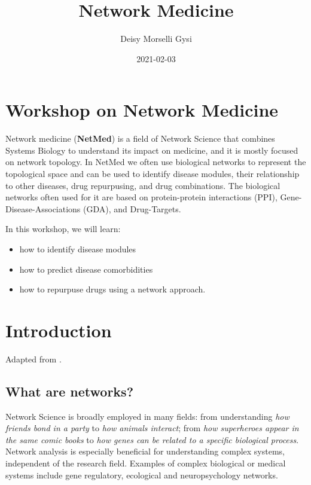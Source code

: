 \documentclass[
]{book}
\title{Network Medicine}
\author{Deisy Morselli Gysi}
\date{2021-02-03}
\providecommand{\tightlist}{%
  \setlength{\itemsep}{0pt}\setlength{\parskip}{0pt}}
\begin{document}
\maketitle

{
\setcounter{tocdepth}{1}
\tableofcontents
}
\hypertarget{workshop-on-network-medicine}{%
\chapter{Workshop on Network Medicine}\label{workshop-on-network-medicine}}

Network medicine (\textbf{NetMed}) is a field of Network Science that combines Systems Biology to understand its impact on medicine, and it is mostly focused on network topology. In NetMed we often use biological networks to represent the topological space and can be used to identify disease modules, their relationship to other diseases, drug repurpusing, and drug combinations. The biological networks often used for it are based on protein-protein interactions (PPI), Gene-Disease-Associations (GDA), and Drug-Targets.

In this workshop, we will learn:

\begin{itemize}
\tightlist
\item
  how to identify disease modules
\item
  how to predict disease comorbidities
\item
  how to repurpuse drugs using a network approach.
\end{itemize}

\hypertarget{intro}{%
\chapter{Introduction}\label{intro}}

Adapted from \citet{Gysi2020}.

\hypertarget{whatarenets}{%
\section{What are networks?}\label{whatarenets}}

Network Science is broadly employed in many fields: from understanding \emph{how friends bond in a party} to \emph{how animals interact}; from \emph{how superheroes appear in the same comic books} to \emph{how genes can be related to a specific biological process}. Network analysis is especially beneficial for understanding complex systems, independent of the research field. Examples of complex biological or medical systems include gene regulatory, ecological and neuropsychology networks.
\end{document}

